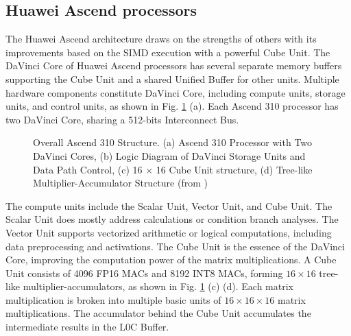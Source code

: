 \documentclass[12pt]{extbook}
\begin{document}
\subsection{Huawei Ascend processors}

The Huawei Ascend architecture draws on the strengths of others with its improvements based on the SIMD execution with a powerful Cube Unit. The DaVinci Core of Huawei Ascend processors has several separate memory buffers supporting the Cube Unit and a shared Unified Buffer for other units. Multiple hardware components constitute DaVinci Core, including compute units, storage units, and control units, as shown in Fig. \ref{fig:dav} (a). Each Ascend 310 processor has two DaVinci Core, sharing a 512-bits Interconnect Bus.

\begin{figure}[tb]
    \caption{Overall Ascend 310 Structure. (a) Ascend 310 Processor with Two DaVinci Cores, (b) Logic Diagram of DaVinci Storage Units and Data Path Control, (c) 16 $\times$ 16 Cube Unit structure, (d) Tree-like Multiplier-Accumulator Structure (from \cite{DBLP:conf/hotchips/LiaoTXZ19})}
    \label{fig:dav}
    \end{figure}

The compute units include the Scalar Unit, Vector Unit, and Cube Unit. The Scalar Unit does mostly address calculations or condition branch analyses. The Vector Unit supports vectorized arithmetic or logical computations, including data preprocessing and activations. The Cube Unit is the essence of the DaVinci Core, improving the computation power of the matrix multiplications. A Cube Unit consists of 4096 FP16 MACs and 8192 INT8 MACs, forming $16 \times 16$ tree-like multiplier-accumulators, as shown in Fig. \ref{fig:dav} (c) (d). Each matrix multiplication is broken into multiple basic units of $16 \times 16 \times 16$ matrix multiplications. The accumulator behind the Cube Unit accumulates the intermediate results in the L0C Buffer.
\end{document}
